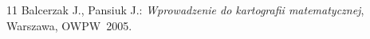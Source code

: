 \setcounter{secnumdepth}{-1}




%
%

\begin {thebibliography}{11}
 Balcerzak J., Pansiuk J.: \emph{Wprowadzenie do kartografii matematycznej}, Warszawa, OWPW~2005.
\end {thebibliography}


\listoffigures

\listoftables